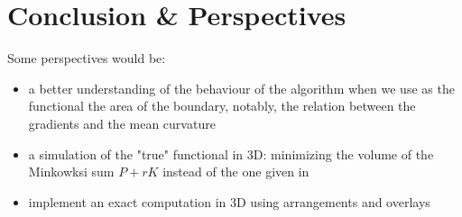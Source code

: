 \chapter{Conclusion \& Perspectives}


Some perspectives would be:
\begin{itemize}
    \item a better understanding of the behaviour of the algorithm when we use
        as the functional the area of the boundary, notably, the relation
        between the gradients and the mean curvature
    \item a simulation of the "true" functional in 3D: minimizing the volume of
        the Minkowksi sum $ P + rK $ instead of the one given in  %
    \item implement an exact computation in 3D using arrangements and overlays
\end{itemize}

